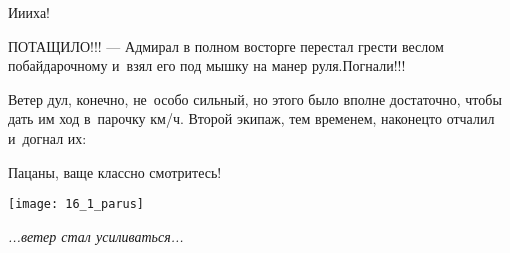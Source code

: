 \par
\endgroup

\noindent
\begin{minipage}{0.42\textwidth} %
	\setlength{\parindent}{1.0cm}  %
	\setlength{\parskip}{0.25cm}     %
	
	\diagdash И\sdash и\sdash иха! 
	
	\diagdash ПОТАЩИЛО!!! --- Адмирал в полном восторге перестал грести веслом по\sdash байдарочному и~взял его под мышку на манер руля.\mdash Погнали!!!
	
	Ветер дул, конечно, не~особо сильный, но этого было вполне достаточно, чтобы дать им ход в~парочку км/ч. Второй экипаж, тем временем, наконец\sdash то отчалил и~догнал их:
	
	\diagdash Пацаны, ваще классно смотритесь!\mdash

%	
%	
	
\end{minipage}\hfill
\begin{minipage}{0.54\textwidth}%
	\centering
	\texttt{[image: 16\_1\_parus]}
	
	{\small\textit{...ветер стал усиливаться...}}
\end{minipage}




%
%

